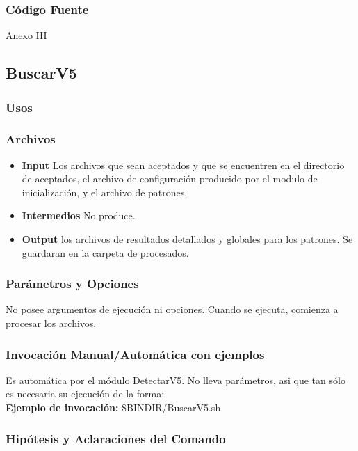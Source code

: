 \documentclass[a4paper,10pt,titlepage]{article}
\begin{document}
		\subsubsection{C\'odigo Fuente}
			Anexo III

	\subsection{BuscarV5}
		\subsubsection{Usos}
			 

		\subsubsection{Archivos}
			\begin {itemize}
				\item \textbf{Input} {Los archivos que sean aceptados y que se encuentren en el directorio de aceptados, el archivo de configuración producido por el modulo de inicialización, y el archivo de patrones.}
				\item \textbf{Intermedios} {No produce.}
				\item \textbf{Output} {los archivos de resultados detallados y globales para los patrones. Se guardaran en la carpeta de procesados.}
			\end{itemize}

		\subsubsection{Par\'ametros y Opciones}
			 No posee argumentos de ejecución ni opciones. Cuando se ejecuta, comienza a procesar los archivos.
	
		\subsubsection{Invocaci\'on Manual/Autom\'atica con ejemplos}
Es automática por el módulo DetectarV5. No lleva parámetros, asi que tan sólo es necesaria su ejecución de la forma:\\

{\bf Ejemplo de invocación:} 
\$BINDIR/BuscarV5.sh


		\subsubsection{Hip\'otesis y Aclaraciones del Comando}
\end{document}
